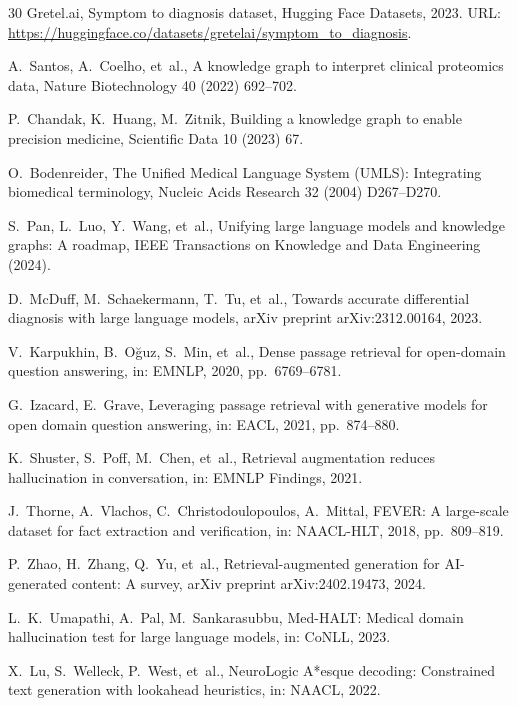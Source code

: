 \documentclass[preprint,12pt]{elsarticle}
\begin{document}
\begin{thebibliography}{30}
Gretel.ai, Symptom to diagnosis dataset, Hugging Face Datasets, 2023. URL: \url{https://huggingface.co/datasets/gretelai/symptom_to_diagnosis}.

A.~Santos, A.~Coelho, et~al., A knowledge graph to interpret clinical proteomics data, Nature Biotechnology 40 (2022) 692--702.

P.~Chandak, K.~Huang, M.~Zitnik, Building a knowledge graph to enable precision medicine, Scientific Data 10 (2023) 67.

O.~Bodenreider, The Unified Medical Language System (UMLS): Integrating biomedical terminology, Nucleic Acids Research 32 (2004) D267--D270.

S.~Pan, L.~Luo, Y.~Wang, et~al., Unifying large language models and knowledge graphs: A roadmap, IEEE Transactions on Knowledge and Data Engineering (2024).

D.~McDuff, M.~Schaekermann, T.~Tu, et~al., Towards accurate differential diagnosis with large language models, arXiv preprint arXiv:2312.00164, 2023.

V.~Karpukhin, B.~O\u{g}uz, S.~Min, et~al., Dense passage retrieval for open-domain question answering, in: EMNLP, 2020, pp.~6769--6781.

G.~Izacard, E.~Grave, Leveraging passage retrieval with generative models for open domain question answering, in: EACL, 2021, pp.~874--880.

K.~Shuster, S.~Poff, M.~Chen, et~al., Retrieval augmentation reduces hallucination in conversation, in: EMNLP Findings, 2021.

J.~Thorne, A.~Vlachos, C.~Christodoulopoulos, A.~Mittal, FEVER: A large-scale dataset for fact extraction and verification, in: NAACL-HLT, 2018, pp.~809--819.

P.~Zhao, H.~Zhang, Q.~Yu, et~al., Retrieval-augmented generation for AI-generated content: A survey, arXiv preprint arXiv:2402.19473, 2024.

L.~K.~Umapathi, A.~Pal, M.~Sankarasubbu, Med-HALT: Medical domain hallucination test for large language models, in: CoNLL, 2023.

X.~Lu, S.~Welleck, P.~West, et~al., NeuroLogic A*esque decoding: Constrained text generation with lookahead heuristics, in: NAACL, 2022.


\end{thebibliography}
\end{document}
